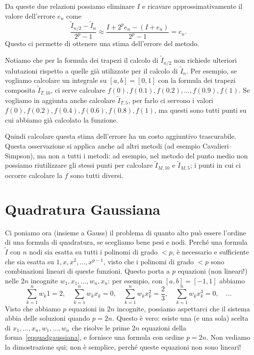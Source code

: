 \documentclass[a4paper]{report}
\theoremstyle{definiton}
\theoremstyle{remark}
\begin{document}
Da queste due relazioni possiamo eliminare $I$ e ricavare approssimativamente il valore dell'errore $e_n$ come
\[
\frac{\tilde{I}_{n/2} - \tilde{I}_{n}}{2^p -1} \approx \frac{I + 2^p e_n -(I+e_n)}{2^p-1} = e_n.
\]
Questo ci permette di ottenere una stima dell'errore del metodo.

Notiamo che per la formula dei trapezi il calcolo di $\tilde{I}_{n/2}$ non richiede ulteriori valutazioni rispetto a quelle già utilizzate per il calcolo di $\tilde{I}_n$. Per esempio, se vogliamo calcolare un integrale su $[a,b]=[0,1]$ con la formula dei trapezi composita $\tilde{I}_{T,10}$, ci serve calcolare $f(0),f(0.1),f(0.2),\dots,f(0.9),f(1)$. Se vogliamo in aggiunta anche calcolare $\tilde{I}_{T,5}$, per farlo ci servono i valori $f(0),f(0.2),f(0.4),f(0.6),f(0.8),f(1)$, ma questi sono tutti punti su cui abbiamo già calcolato la funzione.

Quindi calcolare questa stima dell'errore ha un costo aggiuntivo trascurabile. Questa osservazione si applica anche ad altri metodi (ad esempio Cavalieri--Simpson), ma non a tutti i metodi: ad esempio, nel metodo del punto medio non possiamo riutilizzare gli stessi punti per calcolare $\tilde{I}_{M,10}$ e $\tilde{I}_{M,5}$; i punti in cui ci occorre calcolare la $f$ sono tutti diversi.

\section{Quadratura Gaussiana}
Ci poniamo ora (insieme a Gauss) il problema di quanto alto può essere l'ordine di una formula di quadratura, se scegliamo bene pesi e nodi. Perché una formula $\tilde{I}$ con $n$ nodi sia esatta su tutti i polinomi di grado $ < p$, è necessario e sufficiente che sia esatta su $1, x, x^2, \dots, x^{p-1}$, visto che i polinomi di grado $< p$ sono combinazioni lineari di queste funzioni. Questo porta a $p$ equazioni (non lineari!) nelle $2n$ incognite $w_1,x_1,\dots, w_n,x_n$: per esempio, con $[a,b]=[-1,1]$ abbiamo
\begin{equation} \label{eqquadgaussiana}
    \sum_{k=1}^n w_k 1 = 2, \quad \sum_{k=1}^n w_k x_k = 0, \quad \sum_{k=1}^n w_k x_k^2 = \frac23, \quad \sum_{k=1}^n w_k x_k^3 = 0, \quad \dots    
\end{equation}
Visto che abbiamo $p$ equazioni in $2n$ incognite, possiamo aspettarci che il sistema abbia delle soluzioni quando $p=2n$.  Questo è vero: esiste una (e una sola) scelta di $x_1,\dots,x_n,w_1,\dots,w_n$ che risolve le prime $2n$ equazioni della forma~\eqref{eqquadgaussiana}, e fornisce una formula con ordine $p=2n$. Non vediamo la dimostrazione qui; non è semplice, perché queste equazioni non sono lineari!
\end{document}
